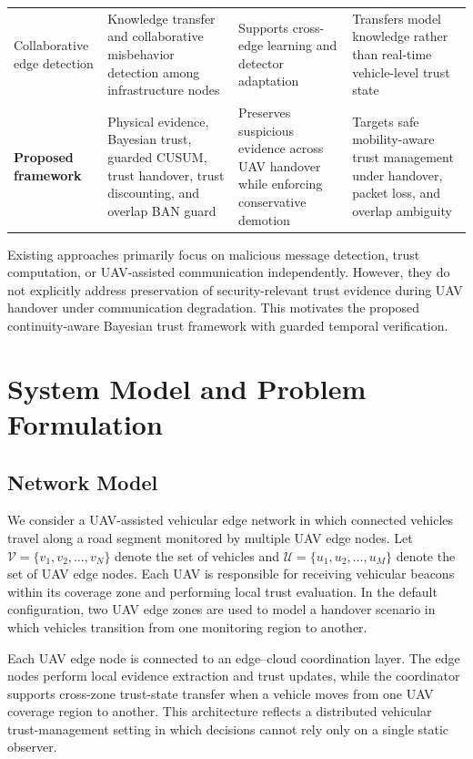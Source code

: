 \documentclass[journal]{IEEEtran}
\begin{document}
\begin{table}[!t]
\begin{tabularx}{\textwidth}{l X X X}
Collaborative edge detection
& Knowledge transfer and collaborative misbehavior detection among infrastructure nodes
& Supports cross-edge learning and detector adaptation
& Transfers model knowledge rather than real-time vehicle-level trust state \\

\textbf{Proposed framework}
& Physical evidence, Bayesian trust, guarded CUSUM, trust handover, trust discounting, and overlap BAN guard
& Preserves suspicious evidence across UAV handover while enforcing conservative demotion
& Targets safe mobility-aware trust management under handover, packet loss, and overlap ambiguity \\
\bottomrule
\end{tabularx}
\end{table}

Existing approaches primarily focus on malicious message detection,
trust computation, or UAV-assisted communication independently. However,
they do not explicitly address preservation of security-relevant trust
evidence during UAV handover under communication degradation. This motivates
the proposed continuity-aware Bayesian trust framework with guarded temporal
verification.

\section{System Model and Problem Formulation}
\label{sec:system_model}

\subsection{Network Model}
\label{subsec:network_model}

We consider a UAV-assisted vehicular edge network in which connected vehicles travel along a road segment monitored by multiple UAV edge nodes. Let
\(\mathcal{V}=\{v_1,v_2,\ldots,v_N\}\) denote the set of vehicles and
\(\mathcal{U}=\{u_1,u_2,\ldots,u_M\}\) denote the set of UAV edge nodes. Each UAV is responsible for receiving vehicular beacons within its coverage zone and performing local trust evaluation. In the default configuration, two UAV edge zones are used to model a handover scenario in which vehicles transition from one monitoring region to another.

Each UAV edge node is connected to an edge--cloud coordination layer. The edge nodes perform local evidence extraction and trust updates, while the coordinator supports cross-zone trust-state transfer when a vehicle moves from one UAV coverage region to another. This architecture reflects a distributed vehicular trust-management setting in which decisions cannot rely only on a single static observer.
\end{document}
